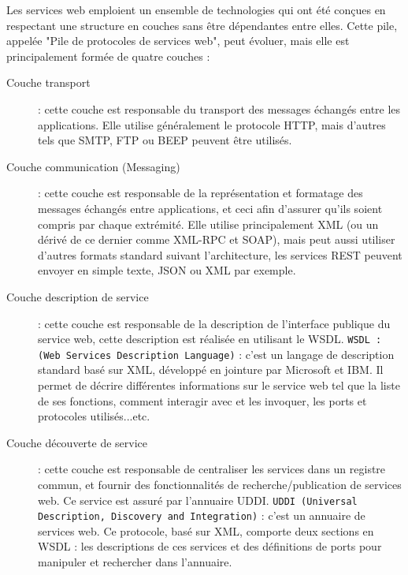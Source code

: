 Les services web emploient un ensemble de technologies qui ont été conçues en respectant une structure en couches sans être dépendantes entre elles. Cette pile, appelée "Pile de protocoles de services web", peut évoluer, mais elle est principalement formée de quatre couches : \cite{refTutorialPointsWS}
\begin{description}
	\item[Couche transport] : cette couche est responsable du transport des messages échangés entre les applications. Elle utilise généralement le protocole HTTP, mais d'autres tels que SMTP, FTP ou BEEP peuvent être utilisés.
	\item [Couche communication (Messaging)] : cette couche est responsable de la représentation et formatage des messages échangés entre applications, et ceci afin d'assurer qu'ils soient compris par chaque extrémité. Elle utilise principalement XML (ou un dérivé de ce dernier comme XML-RPC et SOAP), mais peut aussi utiliser d'autres formats standard suivant l'architecture, les services REST peuvent envoyer en simple texte, JSON ou XML par exemple.
	\item[Couche description de service] : cette couche est responsable de la description de l'interface publique du service web, cette description est réalisée en utilisant le WSDL.\newline
	      \texttt{WSDL : (Web Services Description Language)} : c'est un langage de description standard basé sur XML, développé en jointure par Microsoft et IBM. Il permet de décrire différentes informations sur le service web tel que la liste de ses fonctions, comment interagir avec et les invoquer, les ports et protocoles utilisés...etc.
	\item[Couche découverte de service] : cette couche est responsable de centraliser les services dans un registre commun, et fournir des fonctionnalités de recherche/publication de services web. Ce service est assuré par l'annuaire UDDI.\newline
	      \texttt{UDDI (Universal Description, Discovery and Integration)} : c'est un annuaire de services web. Ce protocole, basé sur XML, comporte deux sections en WSDL : les descriptions de ces services et des définitions de ports pour manipuler et rechercher dans l'annuaire.
\end{description}
			
